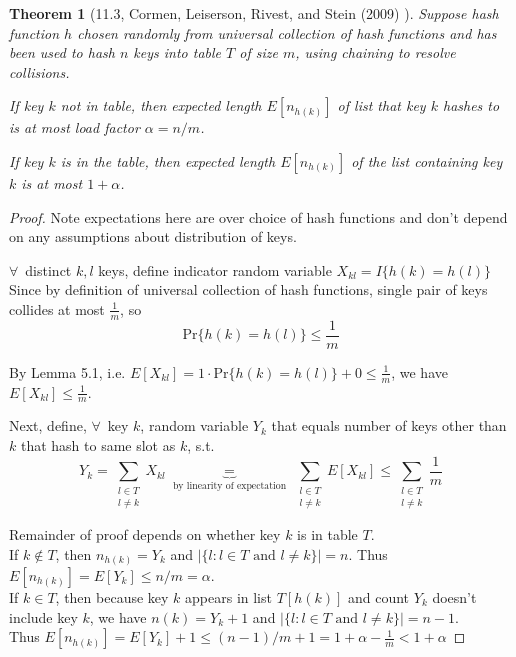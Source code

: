 \documentclass[10pt]{amsart}
\newtheorem{theorem}{Theorem}
\begin{document}
\begin{multicols*}{2}
\begin{theorem}[11.3, Cormen, Leiserson, Rivest, and Stein (2009) \cite{CLRS2009}]
Suppose hash function $h$ chosen randomly from universal collection of hash functions and has been used to hash $n$ keys into table $T$ of size $m$, using chaining to resolve collisions.

If key $k$ not in table, then expected length $E[n_{h(k)}]$ of list that key $k$ hashes to is at most load factor $\alpha = n/m$.

If key $k$ is in the table, then expected length $E[n_{h(k)}]$ of the list containing key $k$ is at most $1+\alpha$.
\end{theorem}

\begin{proof}
Note expectations here are over choice of hash functions and don't depend on any assumptions about distribution of keys.

$\forall \, $ distinct $k, l$ keys, define indicator random variable $X_{kl} = I\lbrace h(k) = h(l) \rbrace$ \\
Since by definition of universal collection of hash functions, single pair of keys collides at most $\frac{1}{m}$, so
\[
\text{Pr}\lbrace h(k) = h(l) \rbrace \leq \frac{1}{m}
\]

By Lemma 5.1, i.e. $E[X_{kl}] = 1 \cdot \text{Pr}\lbrace h(k) = h(l) \rbrace + 0 \leq \frac{1}{m}$, we have $E[X_{kl}] \leq \frac{1}{m}$.

Next, define, $\forall \,$ key $k$, random variable $Y_k$ that equals number of keys other than $k$ that hash to same slot as $k$, s.t. 
\[
Y_k = \sum_{\substack{l \in T \\ l \neq k} } X_{kl} \underbrace{=}_{\text{ by linearity of expectation }} \sum_{ \substack{l \in T \\ l \neq k }} E[X_{kl}] \leq \sum_{ \substack{ l \in T \\ l \neq k } } \frac{1}{m}
\]

Remainder of proof depends on whether key $k$ is in table $T$. \\
If $k \notin T$, then $n_{h(k)} = Y_k$ and $| \lbrace l : l \in T \text{ and } l\neq k \rbrace | = n$. Thus $E[n_{h(k)}] = E[Y_k] \leq n /m = \alpha$. \\
If $k \in T$, then because key $k$ appears in list $T[h(k)]$ and count $Y_k$ doesn't include key $k$, we have $n(k) = Y_k + 1$ and $| \lbrace l : l \in T \text{ and } l \neq k \rbrace | = n-1$. \\
Thus $E [n_{h(k)}] = E[Y_k] + 1 \leq (n-1) / m + 1 = 1 + \alpha - \frac{1}{m} < 1 + \alpha$


\end{proof}
\end{multicols*}
\end{document}
